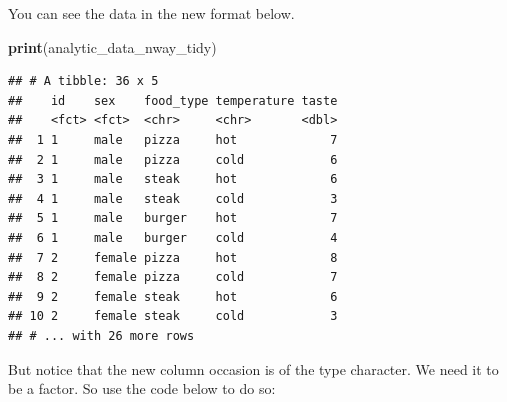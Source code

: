 \documentclass[
]{krantz}
\makeatletter
\newenvironment{Shaded}{\begin{snugshade}}{\end{snugshade}}
\newcommand{\DataTypeTok}[1]{\textcolor[rgb]{0.27,0.27,0.27}{#1}}
\newcommand{\KeywordTok}[1]{\textcolor[rgb]{0.27,0.27,0.27}{\textbf{#1}}}
\newcommand{\NormalTok}[1]{#1}
\newcommand{\OperatorTok}[1]{\textcolor[rgb]{0.43,0.43,0.43}{\textbf{#1}}}
\newcommand{\StringTok}[1]{\textcolor[rgb]{0.5,0.5,0.5}{#1}}
\newenvironment{kframe}{%
\medskip{}
\setlength{\fboxsep}{.8em}
 \def\at@end@of@kframe{}%
 \ifinner\ifhmode%
  \def\at@end@of@kframe{\end{minipage}}%
  \begin{minipage}{\columnwidth}%
 \fi\fi%
 \def\FrameCommand##1{\hskip\@totalleftmargin \hskip-\fboxsep
 \colorbox{shadecolor}{##1}\hskip-\fboxsep
     \hskip-\linewidth \hskip-\@totalleftmargin \hskip\columnwidth}%
 \MakeFramed {\advance\hsize-\width
   \@totalleftmargin\z@ \linewidth\hsize
   \@setminipage}}%
 {\par\unskip\endMakeFramed%
 \at@end@of@kframe}
\renewenvironment{Shaded}{\begin{kframe}}{\end{kframe}}
\makeatother
\begin{document}
\begin{Shaded}
\end{Shaded}

You can see the data in the new format below.

\begin{Shaded}
\begin{Highlighting}[]
\KeywordTok{print}\NormalTok{(analytic_data_nway_tidy)}
\end{Highlighting}
\end{Shaded}

\begin{verbatim}
## # A tibble: 36 x 5
##    id    sex    food_type temperature taste
##    <fct> <fct>  <chr>     <chr>       <dbl>
##  1 1     male   pizza     hot             7
##  2 1     male   pizza     cold            6
##  3 1     male   steak     hot             6
##  4 1     male   steak     cold            3
##  5 1     male   burger    hot             7
##  6 1     male   burger    cold            4
##  7 2     female pizza     hot             8
##  8 2     female pizza     cold            7
##  9 2     female steak     hot             6
## 10 2     female steak     cold            3
## # ... with 26 more rows
\end{verbatim}

But notice that the new column occasion is of the type character. We need it to be a factor. So use the code below to do so:

\begin{Shaded}
\end{Shaded}
\end{document}
